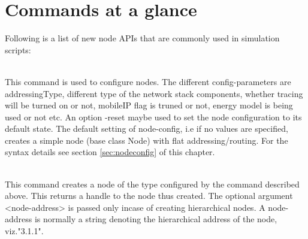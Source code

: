 \section{Commands at a glance}
\label{sec:newnodecommand}

Following is a list of new node APIs that are commonly used in simulation
scripts:

\begin{flushleft}
\\
This command is used to configure nodes. The different config-parameters
are addressingType, different type of the network stack components,
whether tracing will be turned on or not, mobileIP flag is truned or not,
energy model is being used or not etc. An option -reset maybe used to set
the node configuration to its default state. The default setting of 
node-config, i.e if no values are specified, creates a simple node (base
class Node) with flat addressing/routing. For the syntax details see
section \ref{sec:nodeconfig} of this chapter.  


\\
This command creates a node of the type configured by the command
 described above. This returns a handle to the
node thus created. The optional argument <node-address> is passed only
incase of creating hierarchical nodes. A node-address is normally a
string denoting the hierarchical address of the node, viz."3.1.1".

\end{flushleft}
